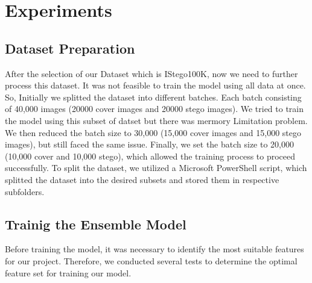 \chapter{Experiments}
\section{Dataset Preparation}
After the selection of our Dataset which is IStego100K\cite{7}, now we need to further process this dataset. It was not feasible to train the model using all data at once. So, Initially we splitted the dataset into different batches. Each batch consisting of 40,000 images (20000 cover images and 20000 stego images). We tried to train the model using this subset of datset but there was mermory Limitation problem. We then reduced the batch size to 30,000 (15,000 cover images and 15,000 stego images), but still faced the same issue. Finally, we set the batch size to 20,000 (10,000 cover and 10,000 stego), which allowed the training process to proceed successfully. To split the dataset, we utilized a Microsoft PowerShell script, which splitted the dataset into the desired subsets and stored them in respective subfolders.

\section{Trainig the Ensemble Model}
Before training the model, it was necessary to identify the most suitable features for our project. Therefore, we conducted several tests to determine the optimal feature set for training our model.
